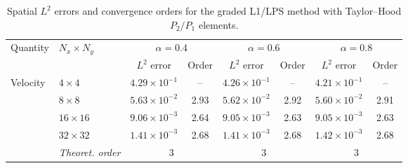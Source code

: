 \documentclass[11pt,a4paper]{article}
\numberwithin{equation}{section}
\renewcommand{\arraystretch}{1.25}
\theoremstyle{plain}
\theoremstyle{definition}
\theoremstyle{remark}
\begin{document}
\begin{table}[htbp]
\begin{tabular}{llcc|cc|cc}
\bottomrule
\end{tabular}
\end{table}


\begin{table}[htbp]
\centering
\caption{Spatial $L^2$ errors and convergence orders for the graded L1/LPS method with Taylor--Hood $P_2/P_1$ elements.}
\label{tab:ex2-space-lps}
\setlength{\tabcolsep}{4pt}
\renewcommand{\arraystretch}{1.1}
\small
\begin{tabular}{llcc|cc|cc}
\toprule
\multirow{2}{*}{Quantity} & \multirow{2}{*}{$N_x\times N_y$}
& \multicolumn{2}{c|}{$\alpha=0.4$}
& \multicolumn{2}{c|}{$\alpha=0.6$}
& \multicolumn{2}{c}{$\alpha=0.8$} \\
\cmidrule(lr){3-4}
\cmidrule(lr){5-6}
\cmidrule(l){7-8}
& & $L^2$ error & Order
& $L^2$ error & Order
& $L^2$ error & Order \\
\midrule

\multirow{5}{*}{Velocity}
& $4\times4$   & $4.29\times10^{-1}$ & --
               & $4.26\times10^{-1}$ & --
               & $4.21\times10^{-1}$ & -- \\
& $8\times8$   & $5.63\times10^{-2}$ & 2.93
               & $5.62\times10^{-2}$ & 2.92
               & $5.60\times10^{-2}$ & 2.91 \\
& $16\times16$ & $9.06\times10^{-3}$ & 2.64
               & $9.05\times10^{-3}$ & 2.63
               & $9.05\times10^{-3}$ & 2.63 \\
& $32\times32$ & $1.41\times10^{-3}$ & 2.68
               & $1.41\times10^{-3}$ & 2.68
               & $1.42\times10^{-3}$ & 2.68 \\
& \textit{Theoret. order}
& \multicolumn{2}{c|}{3}
& \multicolumn{2}{c|}{3}
& \multicolumn{2}{c}{3} \\



\end{tabular}
\end{table}
\end{document}
